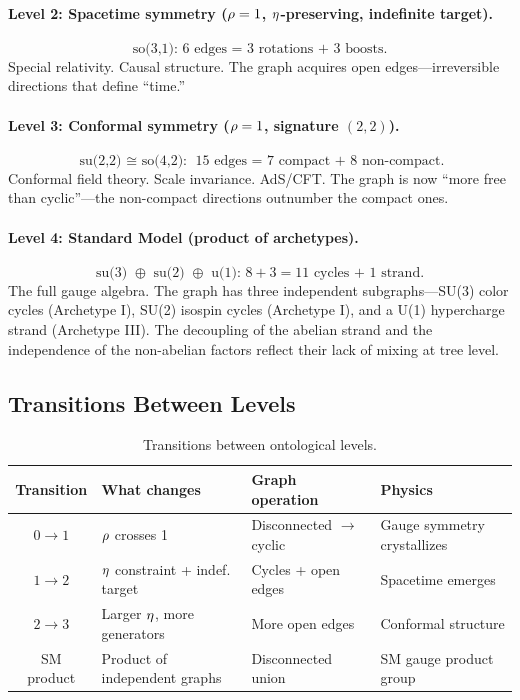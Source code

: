 \paragraph{Level 2: Spacetime symmetry ($\rho = 1$, $\eta$-preserving, indefinite target).}
\begin{equation}
\text{so(3,1): } 6 \text{ edges = 3 rotations + 3 boosts.}
\end{equation}
Special relativity. Causal structure. The graph acquires open edges---irreversible directions that define ``time.''

\paragraph{Level 3: Conformal symmetry ($\rho = 1$, signature $(2,2)$).}
\begin{equation}
\text{su(2,2) $\cong$ so(4,2): } 15 \text{ edges = 7 compact + 8 non-compact.}
\end{equation}
Conformal field theory. Scale invariance. AdS/CFT. The graph is now ``more free than cyclic''---the non-compact directions outnumber the compact ones.

\paragraph{Level 4: Standard Model (product of archetypes).}
\begin{equation}
\text{su(3) $\oplus$ su(2) $\oplus$ u(1): } 8 + 3 = 11 \text{ cycles + 1 strand.}
\end{equation}
The full gauge algebra. The graph has three independent subgraphs---SU(3) color cycles (Archetype I), SU(2) isospin cycles (Archetype I), and a U(1) hypercharge strand (Archetype III). The decoupling of the abelian strand and the independence of the non-abelian factors reflect their lack of mixing at tree level.

\subsection{Transitions Between Levels}\label{sec:level_transitions}

\begin{table}[h]
\centering
\begin{tabular}{c l l l}
\hline\hline
Transition & What changes & Graph operation & Physics \\
\hline
$0 \to 1$ & $\rho$ crosses 1 & Disconnected $\to$ cyclic & Gauge symmetry crystallizes \\
$1 \to 2$ & $\eta$ constraint + indef. target & Cycles + open edges & Spacetime emerges \\
$2 \to 3$ & Larger $\eta$, more generators & More open edges & Conformal structure \\
SM product & Product of independent graphs & Disconnected union & SM gauge product group \\
\hline\hline
\end{tabular}
\caption{Transitions between ontological levels.}
\end{table}

